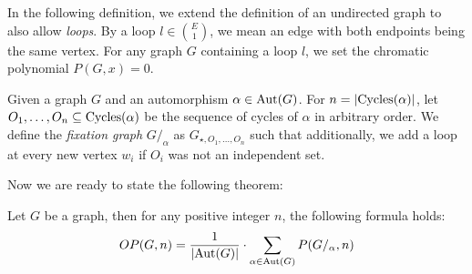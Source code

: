 In the following definition, we extend the definition of an undirected graph to also allow \textit{ loops}. By a loop $l \in \binom{E}{1}$, we mean an edge with both endpoints being the same vertex. For any graph $G$ containing a loop $l$, we set the chromatic polynomial $P(G,x) = 0$.

\begin{defn}
    Given a graph $G$ and an automorphism $\alpha \in \operatorname{Aut}(G)$. For $n = \left|{\operatorname{Cycles}(\alpha)}\right|$, let $O_1, \ldots ,O_n \subseteq \operatorname{Cycles}(\alpha)$ be the sequence of cycles of $\alpha$ in arbitrary order. We define the \emph{fixation graph} $G /_{\alpha}$ as $G_{\star,O_1, \ldots , O_n}$ such that additionally, we add a loop at every new vertex $w_i$ if $O_i$ was not an independent set.
\end{defn}

Now we are ready to state the following theorem:

\begin{thm} \label{thm:count-orb-chrompoly}
    Let $G$ be a graph, then for any positive integer $n$, the following formula holds:
    \begin{equation} \label{eqn:oribtal-chrompoly}
        OP(G,n) = \frac{1}{\left|{\operatorname{Aut}(G)}\right|} \cdot \sum_{\alpha \in \operatorname{Aut}(G)}P(G/_\alpha,n)
    \end{equation}
\end{thm}

